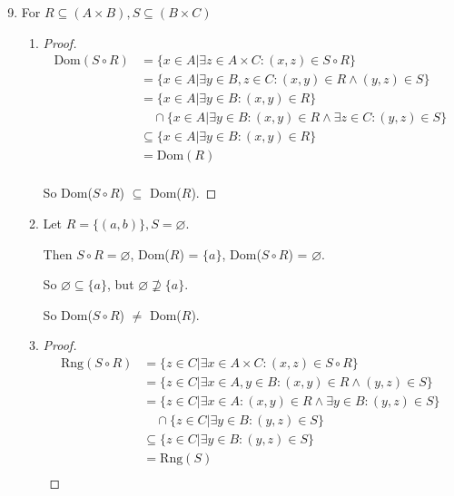 \documentclass[12pt,letterpaper]{article}
\begin{document}
\begin{enumerate}
\begin{enumerate}
        \setcounter{enumii}{8}
        \item
          For $R \subseteq (A \times B), S \subseteq (B \times C)$
          \begin{enumerate}
            \item
              \begin{proof}
                \begin{align*}
                  \text{Dom}(S \circ R)
                  &= \{x \in A | \exists z \in A \times C : (x, z) \in S \circ R\} \\
                  &= \{x \in A | \exists y \in B, z \in C : (x, y) \in R \land (y, z) \in S\} \\
                  &= \{x \in A | \exists y \in B : (x, y) \in R\} \\
                  &\quad \cap \{x \in A | \exists y \in B : (x, y) \in R \land \exists z \in C : (y, z) \in S\} \\
                  &\subseteq \{x \in A | \exists y \in B : (x, y) \in R\} \\
                  &= \text{Dom}(R) \\
                \end{align*}

                So Dom($S \circ R$) $\subseteq$ Dom($R$).
              \end{proof}
            \item
              Let $R = \{(a, b)\}, S = \varnothing$.

              Then $S \circ R = \varnothing$, Dom($R$) = $\{a\}$, Dom($S \circ R$) = $\varnothing$.

              So $\varnothing \subseteq \{a\}$, but $\varnothing \not\supseteq \{a\}$.

              So Dom($S \circ R$) $\neq$ Dom($R$).
            \item
              \begin{proof}
                \begin{align*}
                  \text{Rng}(S \circ R)
                  &= \{z \in C | \exists x \in A \times C : (x, z) \in S \circ R\} \\
                  &= \{z \in C | \exists x \in A, y \in B : (x, y) \in R \land (y, z) \in S\} \\
                  &= \{z \in C | \exists x \in A : (x, y) \in R \land \exists y \in B : (y, z) \in S\} \\
                  &\quad \cap \{z \in C | \exists y \in B : (y, z) \in S\} \\
                  &\subseteq \{z \in C | \exists y \in B : (y, z) \in S\} \\
                  &= \text{Rng}(S) \\
                \end{align*}


\end{proof}
\end{enumerate}
\end{enumerate}
\end{enumerate}
\end{document}
